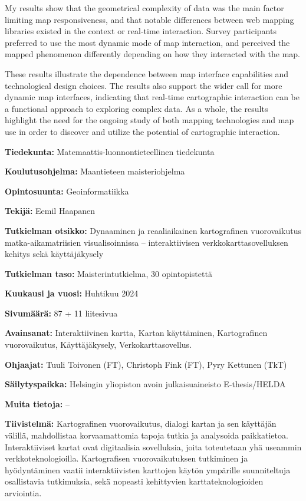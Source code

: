 \begin{spacing}{1}
My results show that the geometrical complexity of data was the main factor limiting
map responsiveness, and that notable differences between web mapping libraries existed
in the context or real-time interaction.
Survey participants preferred to use the most dynamic mode of map interaction,
and perceived the mapped phenomenon differently depending on how they interacted with the map.

These results illustrate the dependence between map interface capabilities and technological design choices.
The results also support the wider call for more dynamic map interfaces,
indicating that real-time cartographic interaction can be a functional approach to exploring complex data.
As a whole, the results highlight the need for the ongoing study of both mapping technologies and map use
in order to discover and utilize the potential of cartographic interaction.

\newpage

\textbf{Tiedekunta:} Matemaattis-luonnontieteellinen tiedekunta

\textbf{Koulutusohjelma:} Maantieteen maisteriohjelma

\textbf{Opintosuunta:} Geoinformatiikka

\textbf{Tekijä:} Eemil Haapanen

\textbf{Tutkielman otsikko:}
Dynaaminen ja reaaliaikainen kartografinen vuorovaikutus matka-aikamatriisien visualisoinnissa --
interaktiivisen verkkokarttasovelluksen kehitys sekä käyttäjäkysely

\textbf{Tutkielman taso:} Maisterintutkielma, 30 opintopistettä

\textbf{Kuukausi ja vuosi:} Huhtikuu 2024  %

\textbf{Sivumäärä:} 87 + 11 liitesivua  %

\textbf{Avainsanat:}
Interaktiivinen kartta,
Kartan käyttäminen,
Kartografinen vuorovaikutus,
Käyttäjäkysely,
Verkokarttasovellus.

\textbf{Ohjaajat:} Tuuli Toivonen (FT), Christoph Fink (FT), Pyry Kettunen (TkT)

\textbf{Säilytyspaikka:} Helsingin yliopiston avoin julkaisuaineisto E-thesis/HELDA

\textbf{Muita tietoja:} --

\textbf{Tiivistelmä:}
Kartografinen vuorovaikutus, dialogi kartan ja sen käyttäjän välillä, mahdollistaa
korvaamattomia tapoja tutkia ja analysoida paikkatietoa.
Interaktiiviset kartat ovat digitaalisia sovelluksia,
joita toteutetaan yhä useammin verkkoteknologioilla.
Kartografisen vuorovaikutuksen tutkiminen ja hyödyntäminen vaatii
interaktiivisten karttojen käytön ympärille suunniteltuja osallistavia tutkimuksia,
sekä nopeasti kehittyvien karttateknologioiden arviointia.


\end{spacing}

